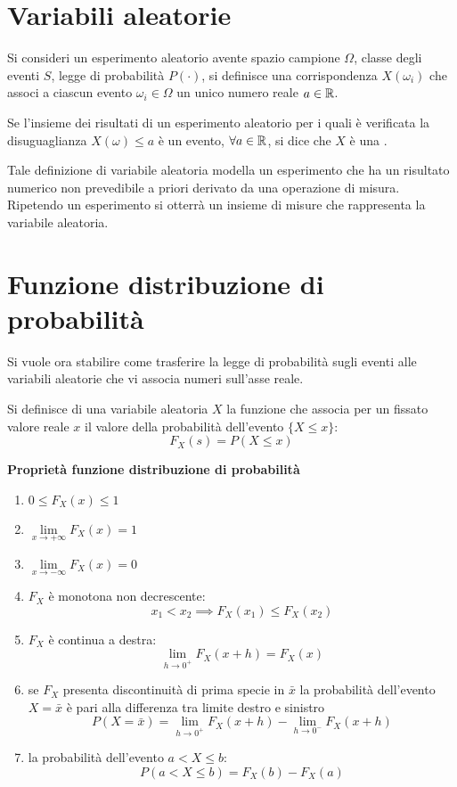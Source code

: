 \section{Variabili aleatorie}
Si consideri un esperimento aleatorio avente spazio campione $\Omega$, classe degli eventi $S$, legge di probabilità $P(\cdot)$, si definisce una corrispondenza $X(\omega_i)$ che associ a ciascun evento $\omega_i\in\Omega$ un unico numero reale $a\in\mathbb{R}$.

Se l'insieme dei risultati di un esperimento aleatorio per i quali è verificata la disuguaglianza $X(\omega)\leq a$ è un evento, $\forall a\in\mathbb{R}$, si dice che $X$ è una .

Tale definizione di variabile aleatoria modella un esperimento che ha un risultato numerico non prevedibile a priori derivato da una operazione di misura. Ripetendo un esperimento si otterrà un insieme di misure che rappresenta la variabile aleatoria.\\

\section{Funzione distribuzione di probabilità}
Si vuole ora stabilire come trasferire la legge di probabilità sugli eventi alle variabili aleatorie che vi associa numeri sull'asse reale.

Si definisce  di una variabile aleatoria $X$ la funzione che associa per un fissato valore reale $x$ il valore della probabilità dell'evento $\lbrace X\leq x\rbrace$:
\begin{equation}
F_X(s)=P(X\leq x)
\end{equation}\label{eq:funz_dist_prob}

\textbf{Proprietà funzione distribuzione di probabilità}
\begin{enumerate}
\item $0\leq F_X(x)\leq 1$
\item $\lim\limits_{x\to+\infty}F_X(x)=1$
\item $\lim\limits_{x\to-\infty}F_X(x)=0$
\item $F_X$ è monotona non decrescente: \[x_1<x_2\implies F_X(x_1)\leq F_X(x_2)\] 
\item $F_X$ è continua a destra: \[\lim\limits_{h\to 0^+}{F_X(x+h)}=F_X(x)\]
\item se $F_X$ presenta discontinuità di prima specie in $\bar{x}$ la probabilità dell'evento $X=\bar{x}$ è pari alla differenza tra limite destro e sinistro \[P(X=\bar{x})=\lim\limits_{h\to 0^+}{F_X(x+h)} - \lim\limits_{h\to 0^-}{F_X(x+h)}\]
\item la probabilità dell'evento $a < X \leq b$:
\[P(a<X\leq b)=F_X(b)-F_X(a)\]
\end{enumerate}

